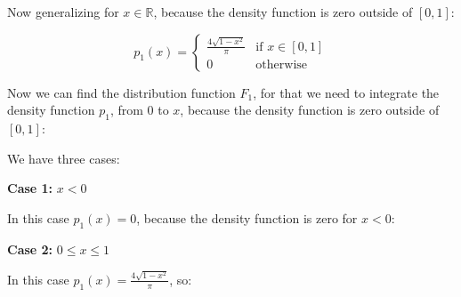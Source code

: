 \singlespacing

Now generalizing for $x \in \mathbb{R}$, because the density function is zero outside of $[0, 1]$:

\singlespacing

\begin{equation}
    p_1(x) = \begin{cases}
        \frac{4\sqrt{1 - x^2}}{\pi} & \text{if } x \in [0, 1] \\
        0                           & \text{otherwise}
    \end{cases}
\end{equation}


\singlespacing

Now we can find the distribution function $F_1$, for that we need to integrate the density function $p_1$,
from $0$ to $x$, because the density function is zero outside of $[0, 1]$:

\singlespacing

We have three cases:

\singlespacing

\textbf{Case 1:} $x < 0$

\singlespacing

In this case $p_1(x) = 0$, because the density function is zero for $x < 0$:

\break
\textbf{Case 2:} $0 \leq x \leq 1$

\singlespacing

In this case $p_1(x) = \frac{4\sqrt{1 - x^2}}{\pi}$, so:
